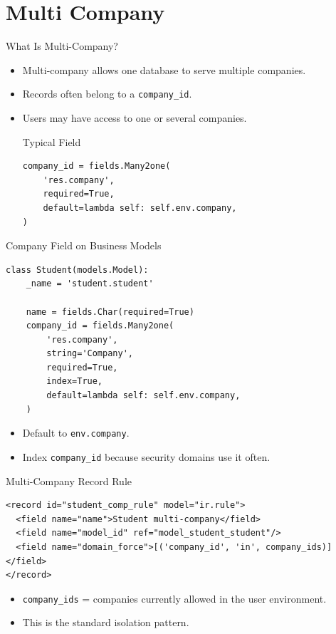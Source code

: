 \section{Multi Company}

\begin{frame}[fragile]{What Is Multi-Company?}
	\begin{itemize}
		\item Multi-company allows one database to serve multiple companies.
		\item Records often belong to a \texttt{company\_id}.
		\item Users may have access to one or several companies.
\begin{block}{Typical Field}
\begin{lstlisting}
company_id = fields.Many2one(
	'res.company',
	required=True,
	default=lambda self: self.env.company,
)
\end{lstlisting}
\end{block}
	\end{itemize}
\end{frame}

\begin{frame}[fragile]{Company Field on Business Models}
\begin{lstlisting}
class Student(models.Model):
	_name = 'student.student'

	name = fields.Char(required=True)
	company_id = fields.Many2one(
		'res.company',
		string='Company',
		required=True,
		index=True,
		default=lambda self: self.env.company,
	)
\end{lstlisting}
	\begin{itemize}
		\item Default to \texttt{env.company}.
		\item Index \texttt{company\_id} because security domains use it often.
	\end{itemize}
\end{frame}

\begin{frame}[fragile]{Multi-Company Record Rule}
\begin{lstlisting}[style=xml]
<record id="student_comp_rule" model="ir.rule">
  <field name="name">Student multi-company</field>
  <field name="model_id" ref="model_student_student"/>
  <field name="domain_force">[('company_id', 'in', company_ids)]</field>
</record>
\end{lstlisting}
	\begin{itemize}
		\item \texttt{company\_ids} = companies currently allowed in the user environment.
		\item This is the standard isolation pattern.
	\end{itemize}
\end{frame}

